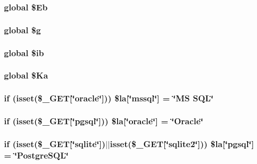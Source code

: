 \subsubsection[{\$Eb}]{\setlength{\rightskip}{0pt plus 5cm}global \$Eb}\label{da/d8e/adminer_8php_a9dd4c69e56a9ab8aa3a1666bef6edd28}
\subsubsection[{\$g}]{\setlength{\rightskip}{0pt plus 5cm}global \$g}\label{da/d8e/adminer_8php_aefddeee0767e684a87f658cf7a43b72b}
\subsubsection[{\$ib}]{\setlength{\rightskip}{0pt plus 5cm}global \$ib}\label{da/d8e/adminer_8php_acc3a1155a1119c46362549a755065360}
\subsubsection[{\$Ka}]{\setlength{\rightskip}{0pt plus 5cm}global \$Ka}\label{da/d8e/adminer_8php_a280e758c458c36b42e49d51eeb3c642a}
\subsubsection[{\$la}]{\setlength{\rightskip}{0pt plus 5cm}if (isset(\$\_\-GET[\char`\"{}oracle\char`\"{}])) \$la[\char`\"{}mssql\char`\"{}] = \char`\"{}MS SQL\char`\"{}}\label{da/d8e/adminer_8php_abdc2513a81654112bf5015ab898754b5}
\subsubsection[{\$la}]{\setlength{\rightskip}{0pt plus 5cm}if (isset(\$\_\-GET[\char`\"{}pgsql\char`\"{}])) \$la[\char`\"{}oracle\char`\"{}] = \char`\"{}Oracle\char`\"{}}\label{da/d8e/adminer_8php_ad5cce424830ff525347dd68dcb45a358}
\subsubsection[{\$la}]{\setlength{\rightskip}{0pt plus 5cm}if (isset(\$\_\-GET[\char`\"{}sqlite\char`\"{}])$|$$|$isset(\$\_\-GET[\char`\"{}sqlite2\char`\"{}])) \$la[\char`\"{}pgsql\char`\"{}] = \char`\"{}PostgreSQL\char`\"{}}\label{da/d8e/adminer_8php_afbe64983cbe62a824af98bc3317dcd8f}
